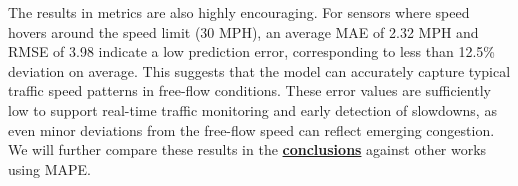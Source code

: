 \begin{table}[!ht]
    \centering
    \caption{MLP Model Performance Metrics}
    \label{table:model_results}
\end{table}

The results in metrics are also highly encouraging. For sensors where speed hovers around the speed limit (30 MPH), an average MAE of 2.32 MPH and RMSE of 3.98 indicate a low prediction error, corresponding to less than 12.5\% deviation on average. This suggests that the model can accurately capture typical traffic speed patterns in free-flow conditions. These error values are sufficiently low to support real-time traffic monitoring and early detection of slowdowns, as even minor deviations from the free-flow speed can reflect emerging congestion. We will further compare these results in the \textbf{\hyperref[sec:conclusions-future]{conclusions}} against other works using MAPE.

